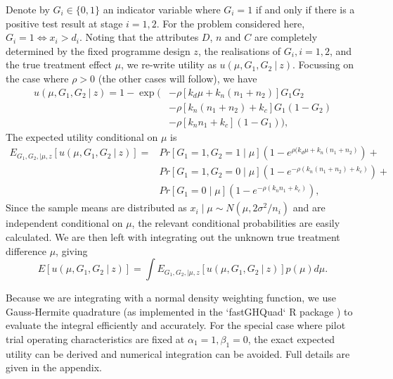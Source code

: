 \documentclass[sagev, Crown]{sagej}
\begin{document}
Denote by $G_i \in \{0, 1\}$ an indicator variable where $G_i = 1$ if and only if there is a positive test result at stage $i = 1,2$. For the problem considered here, $G_i = 1 \Leftrightarrow x_i > d_i$. Noting that the attributes $D$, $n$ and $C$ are completely determined by the fixed programme design $z$, the realisations of $G_i, i=1,2$, and the true treatment effect $\mu$, we re-write utility as $u(\mu, G_1, G_2 ~|~ z)$. Focussing on the case where $\rho > 0$ (the other cases will follow), we have
\begin{equation}
\begin{split}
u(\mu, G_1, G_2 ~|~ z) = 1 - \exp(&-\rho[k_d\mu + k_n (n_1+n_2)] G_1 G_2 \\ 
  &- \rho[k_n (n_1+n_2) + k_c] G_1 (1 - G_2) \\
  &- \rho[k_n n_1 + k_c] (1 - G_1) ),
\end{split}
\end{equation}
The expected utility conditional on $\mu$ is
\begin{equation}\label{eqn:joint_cond_util}
\begin{split}
E_{G_1, G_2, | \mu, z}[u(\mu, G_1, G_2 ~|~ z)] =& Pr[G_1 = 1, G_2 = 1  \mid \mu]\left(1-e^{\rho(k_d\mu + k_n(n_1+n_2)}\right) + \\
& Pr[G_1 = 1,  G_2 = 0  \mid \mu] \left(1- e^{-\rho(k_n (n_1+n_2) + k_c)} \right) + \\
& Pr[G_1 = 0 \mid \mu] \left( 1-e^{-\rho(k_n n_1 + k_c)} \right),
\end{split}
\end{equation}
Since the sample means are distributed as $x_i \mid \mu \sim N(\mu, 2\sigma^2/n_i)$ and are independent conditional on $\mu$, the relevant conditional probabilities are easily calculated. We are then left with integrating out the unknown true treatment difference $\mu$, giving
\begin{equation}\label{eqn:exp_util}
E[u(\mu, G_1, G_2 ~|~ z)] = \int E_{G_1, G_2, | \mu, z}[u(\mu, G_1, G_2 ~|~ z)] p(\mu) d\mu.
\end{equation}

Because we are integrating with a normal density weighting function, we use Gauss-Hermite quadrature (as implemented in the `fastGHQuad` R package \cite{Blocker2018}) to evaluate the integral efficiently and accurately. %
For the special case where pilot trial operating characteristics are fixed at $\alpha_1 = 1, \beta_1 = 0$, the exact expected utility can be derived and numerical integration can be avoided. Full details are given in the appendix.
\end{document}
